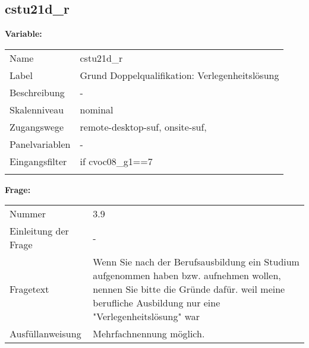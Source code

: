 	
	
	\subsection{cstu21d\_r}
	\label{subSection:cstu21d_r}

	\noindent\textbf{Variable:}\\
		\begin{tabular}{lL{11.3cm}}
			\label{tableVariable:cstu21d_r}
			Name & cstu21d\_r \\
			Label & Grund Doppelqualifikation: Verlegenheitslösung \\
			Beschreibung & - \\
			Skalenniveau & nominal \\
			Zugangswege &
				remote-desktop-suf,
				onsite-suf,
 \\
			Panelvariablen & -
			 \\
			Eingangsfilter & if cvoc08\_g1==7 \\
 \\
		\end{tabular}

		\vspace*{1 cm}
		\noindent\textbf{Frage:}\\
		\begin{tabular}{lL{11.3cm}}
			\label{tableQuestion:cstu21d_r}
			Nummer & 3.9 \\
			Einleitung der Frage & - \\
			Fragetext & Wenn Sie nach der Berufsausbildung ein Studium aufgenommen haben bzw. aufnehmen wollen, nennen Sie bitte die Gründe dafür. 
weil meine berufliche Ausbildung nur eine "Verlegenheitslösung" war \\
			Ausfüllanweisung & Mehrfachnennung möglich. \\
		\end{tabular}





